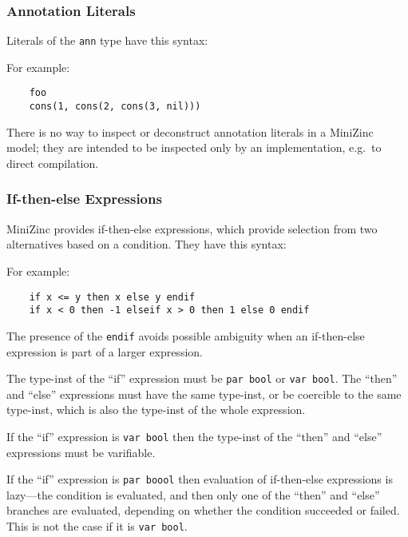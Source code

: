 \documentclass[10pt]{scrartcl}
\begin{document}
\subsubsection{Annotation Literals}
Literals of the \texttt{ann} type have this syntax:
\begin{productions}
    \RuleAnnLiteral
\end{productions}
For example:
\begin{verbatim}
    foo
    cons(1, cons(2, cons(3, nil)))
\end{verbatim}

There is no way to inspect or deconstruct annotation literals in a MiniZinc
model;  they are intended to be inspected only by an implementation, e.g.~to
direct compilation.

\subsubsection{If-then-else Expressions}
MiniZinc provides if-then-else expressions, which provide selection from two
alternatives based on a condition.  They have this syntax:
\begin{productions}
    \RuleIfThenElseExpr
\end{productions}
For example:
\begin{verbatim}
    if x <= y then x else y endif
    if x < 0 then -1 elseif x > 0 then 1 else 0 endif
\end{verbatim}
The presence of the \texttt{endif} avoids possible ambiguity when an
if-then-else expression is part of a larger expression.

The type-inst of the ``if'' expression must be \texttt{par bool} or
\texttt{var bool}.
The ``then'' and
``else'' expressions must have the same type-inst, or be coercible to the
same type-inst, which is also the type-inst of the whole expression.

If the ``if'' expression is \texttt{var bool} then the type-inst of the
``then'' and ``else'' expressions must be varifiable.

If the ``if'' expression is \texttt{par boool} then 
evaluation of if-then-else expressions is lazy---the condition is evaluated,
and then only one of the ``then'' and ``else'' branches are evaluated,
depending on whether the condition succeeded or failed. 
This is not the case if it is \texttt{var bool}.
\end{document}
